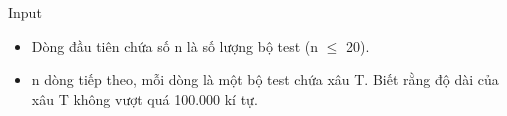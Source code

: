 Input
\begin{itemize}
	\item     Dòng đầu tiên chứa số n là số lượng bộ test (n $\le$ 20).   
	\item     n dòng tiếp theo, mỗi dòng là một bộ test chứa xâu T. Biết rằng độ dài của xâu T không vượt quá 100.000 kí tự.   
\end{itemize}